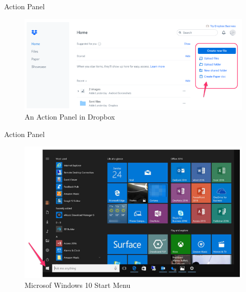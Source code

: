 \documentclass{beamer}
\begin{document}
\begin{frame}[t]{Action Panel}
	\begin{figure}[h]
		\centering
		\includegraphics[scale=0.6]{images/lec08-pic06.png}
		\caption{An Action Panel in Dropbox}
	\end{figure}
\end{frame}

\begin{frame}[t]{Action Panel}
	\begin{figure}[h]
		\centering
		\includegraphics[scale=0.6]{images/lec08-pic07.png}
		\caption{Microsof Windows 10 Start Menu}
	\end{figure}
\end{frame}
\end{document}

